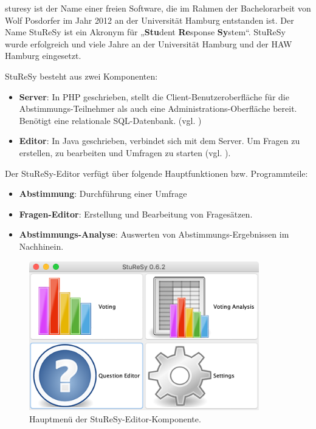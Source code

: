\ac{sturesy} ist der Name einer freien Software, die im Rahmen der Bachelorarbeit von Wolf Posdorfer im Jahr 2012 an der Universität Hamburg entstanden ist\cite{sturesy}. Der Name StuReSy ist ein Akronym für „\textbf{Stu}dent \textbf{Re}sponse \textbf{Sy}stem“. StuReSy wurde erfolgreich und viele Jahre an der Universität Hamburg und der HAW Hamburg eingesetzt.

StuReSy besteht aus zwei Komponenten:
\begin{itemize}
    \item \textbf{Server}: In PHP geschrieben, stellt die Client-Benutzeroberfläche für die Abstimmungs-Teilnehmer als auch eine Administrations-Oberfläche bereit. Benötigt eine relationale SQL-Datenbank. (vgl. \cite{web:sturesy_server_github})
    \item \textbf{Editor}: In Java geschrieben, verbindet sich mit dem Server. Um Fragen zu erstellen, zu bearbeiten und Umfragen zu starten (vgl. \cite{web:sturesy_client_github}).
\end{itemize}


Der StuReSy-Editor verfügt über folgende Hauptfunktionen bzw. Programmteile:
\begin{itemize}
    \item \textbf{Abstimmung}: Durchführung einer Umfrage
    \item \textbf{Fragen-Editor}: Erstellung und Bearbeitung von Fragesätzen.
    \item \textbf{Abstimmungs-Analyse}: Auswerten von Abstimmungs-Ergebnissen im Nachhinein.
\end{itemize}

\begin{figure}[H]
    \includegraphics[width=10cm]{chapter/bewertung/bilder/StuReSy_Hauptmenue.png}
    \centering
    \caption{Hauptmenü der StuReSy-Editor-Komponente.}
    \label{abb:sturesy_hauptmenue}
\end{figure}


